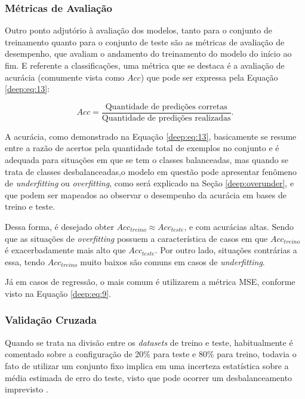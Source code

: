 \subsubsection{Métricas de Avaliação}
\label{deep:metrics}

Outro ponto adjutório à avaliação dos modelos, tanto para o conjunto de treinamento quanto para o conjunto de teste são as métricas de avaliação de desempenho, que avaliam o andamento do treinamento do modelo do início ao fim. E referente a classificações, uma métrica que se destaca é a avaliação de acurácia (comumente vista como $Acc$) que pode ser expressa pela Equação \ref{deep:eq:13}:

\begin{equation}
    \label{deep:eq:13}
    Acc = \frac{\text{Quantidade de predições corretas}}{\text{Quantidade de predições realizadas}}.
\end{equation}

A acurácia, como demonstrado na Equação \ref{deep:eq:13}, basicamente se resume entre a razão de acertos pela quantidade total de exemplos no conjunto e é adequada para situações em que se tem o classes balanceadas, mas quando se trata de classes desbalanceadas,o modelo em questão pode apresentar fenômeno de \textit{underfitting} ou \textit{overfitting}, como será explicado na Seção \ref{deep:overunder}, e que podem ser mapeados ao observar o desempenho da acurácia em bases de treino e teste.

Dessa forma, é desejado obter $Acc_{treino} \approx Acc_{teste}$, e com  acurácias altas. Sendo que as situações de \textit{overfitting} possuem a característica de casos em que $Acc_{treino}$ é exacerbadamente mais alto que $Acc_{teste}$. Por outro lado, situações contrárias a essa, tendo $Acc_{treino}$ muito baixos são comuns em casos de \textit{underfitting}.

Já em casos de regressão, o mais comum é utilizarem a métrica MSE, conforme visto na Equação \ref{deep:eq:9}.


\subsubsection{Validação Cruzada}
\label{deep:cross}

Quando se trata na divisão entre os \textit{datasets} de treino e teste, habitualmente é comentado sobre a configuração de 20\% para teste e 80\% para treino, todavia o fato de utilizar um conjunto fixo implica em uma incerteza estatística sobre a média estimada de erro do teste, visto que pode ocorrer um desbalanceamento imprevisto \citep{Goodfellow2016}.

